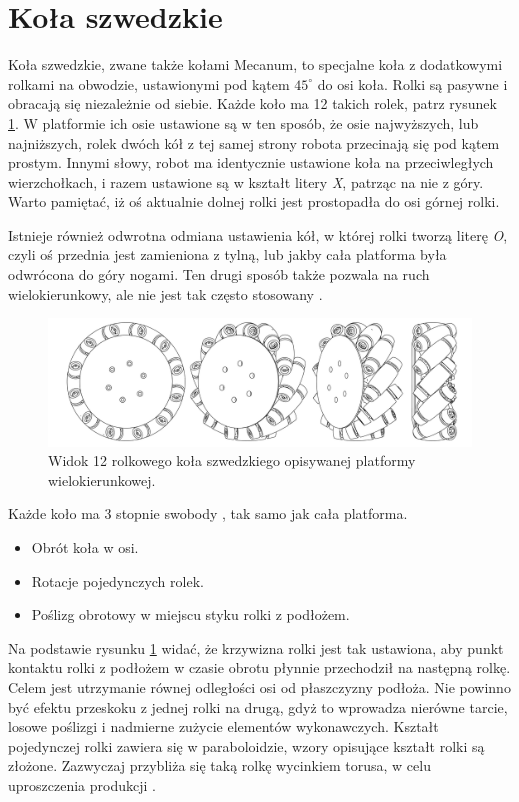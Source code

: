 \section{Koła szwedzkie}
	Koła szwedzkie, zwane także kołami Mecanum, to specjalne koła z dodatkowymi rolkami na obwodzie, ustawionymi pod kątem $45^\circ$ do osi koła.
	Rolki są pasywne i obracają się niezależnie od siebie. Każde koło ma 12 takich rolek, patrz rysunek \ref{fig:wheel}.
	W platformie ich osie ustawione są w ten sposób, że osie najwyższych, lub najniższych, rolek dwóch kół z tej samej strony robota przecinają się pod kątem prostym.
	Innymi słowy, robot ma identycznie ustawione koła na przeciwległych wierzchołkach, i razem ustawione są w kształt litery \emph{X}, patrząc na nie z góry.
	Warto pamiętać, iż oś aktualnie dolnej rolki jest prostopadła do osi górnej rolki.

	Istnieje również odwrotna odmiana ustawienia kół, w której rolki tworzą literę \emph{O}, 
	czyli oś przednia jest zamieniona z tylną, lub jakby cała platforma była odwrócona do góry nogami.
	Ten drugi sposób także pozwala na ruch wielokierunkowy, ale nie jest tak często stosowany \cite{paletobot}.

	\begin{figure}[H]
	\centering
	\includegraphics[width=\textwidth]{graphics/wheel.pdf}
	\caption{Widok 12 rolkowego koła szwedzkiego opisywanej platformy wielokierunkowej.}
	\label{fig:wheel}
	\end{figure} 

	Każde koło ma 3 stopnie swobody \cite{kinematic_modeling}, tak samo jak cała platforma.
	\begin{itemize}
		\item Obrót koła w osi.
		\item Rotacje pojedynczych rolek.
		\item Poślizg obrotowy w miejscu styku rolki z podłożem.
	\end{itemize}

	Na podstawie rysunku \ref{fig:wheel} widać, że krzywizna rolki jest tak ustawiona, aby punkt kontaktu rolki z podłożem w czasie obrotu płynnie przechodził na następną rolkę.
	Celem jest utrzymanie równej odległości osi od płaszczyzny podłoża.
	Nie powinno być efektu przeskoku z jednej rolki na drugą, gdyż to wprowadza nierówne tarcie, losowe poślizgi i nadmierne zużycie elementów wykonawczych.
	Kształt pojedynczej rolki zawiera się w paraboloidzie, wzory opisujące kształt rolki są złożone.
	Zazwyczaj przybliża się taką rolkę wycinkiem torusa, w celu uproszczenia produkcji \cite{rollers}.

